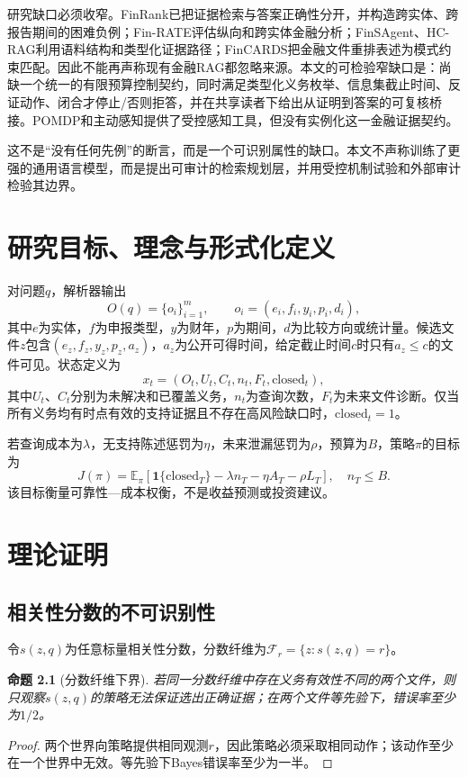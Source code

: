 \documentclass[12pt,openright]{ctexbook}
\newtheorem{proposition}{命题}[chapter]
\begin{document}
研究缺口必须收窄。FinRank已把证据检索与答案正确性分开，并构造跨实体、跨报告期间的困难负例\citep{mansouri2026finrank}；Fin-RATE评估纵向和跨实体金融分析\citep{jiang2026finrate}；FinSAgent、HC-RAG利用语料结构和类型化证据路径\citep{chi2026finsagent,chen2026hcrag}；FinCARDS把金融文件重排表述为模式约束匹配\citep{chen2026fincards}。因此不能再声称现有金融RAG都忽略来源。本文的可检验窄缺口是：尚缺一个统一的有限预算控制契约，同时满足类型化义务枚举、信息集截止时间、反证动作、闭合才停止/否则拒答，并在共享读者下给出从证明到答案的可复核桥接。POMDP和主动感知提供了受控感知工具，但没有实例化这一金融证据契约\citep{krishnamurthy2017pomdp,shi2025active,satsangi2018active}。

这不是“没有任何先例”的断言，而是一个可识别属性的缺口。本文不声称训练了更强的通用语言模型，而是提出可审计的检索规划层，并用受控机制试验和外部审计检验其边界。

\chapter{研究目标、理念与形式化定义}
对问题$q$，解析器输出
\[
 O(q)=\{o_i\}_{i=1}^{m},\qquad o_i=(e_i,f_i,y_i,p_i,d_i),
\]
其中$e$为实体，$f$为申报类型，$y$为财年，$p$为期间，$d$为比较方向或统计量。候选文件$z$包含$(e_z,f_z,y_z,p_z,a_z)$，$a_z$为公开可得时间，给定截止时间$c$时只有$a_z\le c$的文件可见。状态定义为
\[
 x_t=(O_t,U_t,C_t,n_t,F_t,\mathrm{closed}_t),
\]
其中$U_t$、$C_t$分别为未解决和已覆盖义务，$n_t$为查询次数，$F_t$为未来文件诊断。仅当所有义务均有时点有效的支持证据且不存在高风险缺口时，$\mathrm{closed}_t=1$。

若查询成本为$\lambda$，无支持陈述惩罚为$\eta$，未来泄漏惩罚为$\rho$，预算为$B$，策略$\pi$的目标为
\[
 J(\pi)=\mathbb{E}_{\pi}[\mathbf{1}\{\mathrm{closed}_T\}-\lambda n_T-\eta A_T-\rho L_T],\quad n_T\le B.
\]
该目标衡量可靠性—成本权衡，不是收益预测或投资建议。

\chapter{理论证明}
\section{相关性分数的不可识别性}
令$s(z,q)$为任意标量相关性分数，分数纤维为$\mathcal F_r=\{z:s(z,q)=r\}$。
\begin{proposition}[分数纤维下界]
若同一分数纤维中存在义务有效性不同的两个文件，则只观察$s(z,q)$的策略无法保证选出正确证据；在两个文件等先验下，错误率至少为$1/2$。
\end{proposition}
\begin{proof}
两个世界向策略提供相同观测$r$，因此策略必须采取相同动作；该动作至少在一个世界中无效。等先验下Bayes错误率至少为一半。
\end{proof}
\end{document}
